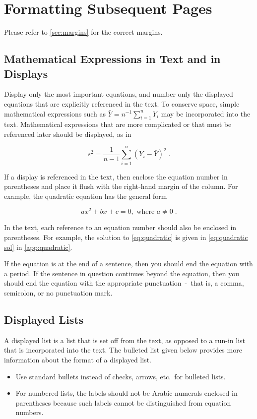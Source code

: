 \documentclass{article}
\begin{document}
\section{Formatting Subsequent Pages}
Please refer to \autoref{sec:margins} for the correct margins.

\subsection{Mathematical Expressions in Text and in Displays}
Display only the most important equations, and number only the displayed equations that are explicitly referenced in the text. To conserve space, simple mathematical expressions such as \mbox{$\bar Y = n^{-1} \sum_{i=1}^n Y_i$} may be incorporated into the text. Mathematical expressions that are more complicated or that must be referenced later should be displayed, as in

\begin{equation}
s^2 = \frac 1 {n-1} \sum_{i=1}^n (Y_i - \bar Y)^2\;. \nonumber
\end{equation}

If a display is referenced in the text, then enclose the equation number in parentheses and place it flush with the right-hand margin of the column. For example, the quadratic equation has the general form

\begin{equation} \label{eq:quadratic}
ax^2 + bx + c = 0, \mbox{ where } a \ne 0\;.
\end{equation}

In the text, each reference to an equation number should also be enclosed in parentheses. For example, the solution to \eqref{eq:quadratic} is given in \eqref{eq:quadratic sol} in \autoref{app:quadratic}.

If the equation is at the end of a sentence, then you should end the equation with a period. If the sentence in question continues beyond the equation, then you should end the equation with the appropriate punctuation~-~that is, a comma, semicolon, or no punctuation mark.


\subsection{Displayed Lists}
A displayed list is a list that is set off from the text, as opposed to a run-in list that is incorporated into the text. The bulleted list given below provides more information about the format of a displayed list. 
\begin{itemize}
	\item Use standard bullets instead of checks, arrows, etc.\ for bulleted lists.
	\item For numbered lists, the labels should not be Arabic numerals enclosed in parentheses because such labels cannot be distinguished from equation numbers.
\end{itemize}
\end{document}
